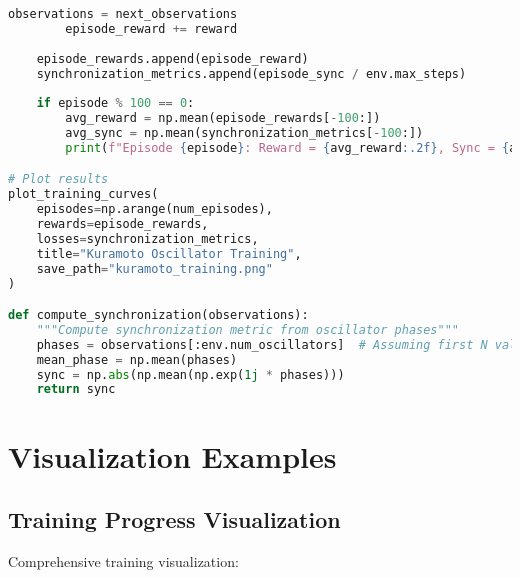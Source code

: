 \begin{lstlisting}[language=python, caption=Kuramoto Oscillator Training]
        observations = next_observations
        episode_reward += reward
    
    episode_rewards.append(episode_reward)
    synchronization_metrics.append(episode_sync / env.max_steps)
    
    if episode % 100 == 0:
        avg_reward = np.mean(episode_rewards[-100:])
        avg_sync = np.mean(synchronization_metrics[-100:])
        print(f"Episode {episode}: Reward = {avg_reward:.2f}, Sync = {avg_sync:.3f}")

# Plot results
plot_training_curves(
    episodes=np.arange(num_episodes),
    rewards=episode_rewards,
    losses=synchronization_metrics,
    title="Kuramoto Oscillator Training",
    save_path="kuramoto_training.png"
)

def compute_synchronization(observations):
    """Compute synchronization metric from oscillator phases"""
    phases = observations[:env.num_oscillators]  # Assuming first N values are phases
    mean_phase = np.mean(phases)
    sync = np.abs(np.mean(np.exp(1j * phases)))
    return sync
\end{lstlisting}

\section{Visualization Examples}

\subsection{Training Progress Visualization}

Comprehensive training visualization:

